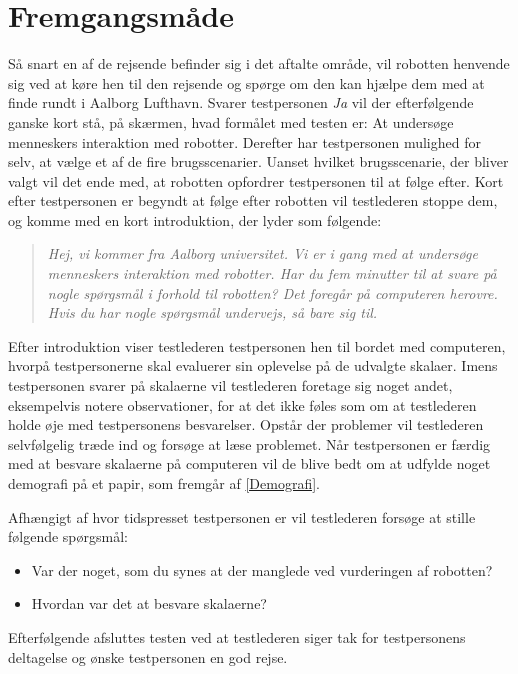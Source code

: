 \section{Fremgangsmåde}
\label{TestAfSkalaFremgangsmaade}
%
Så snart en af de rejsende befinder sig i det aftalte område, vil robotten henvende sig ved at køre hen til den rejsende og spørge om den kan hjælpe dem med at finde rundt i Aalborg Lufthavn. Svarer testpersonen \textit{Ja} vil der efterfølgende ganske kort stå, på skærmen, hvad formålet med testen er: At undersøge menneskers interaktion med robotter. Derefter har testpersonen mulighed for selv, at vælge et af de fire brugsscenarier. Uanset hvilket brugsscenarie, der bliver valgt vil det ende med, at robotten opfordrer testpersonen til at følge efter. Kort efter testpersonen er begyndt at følge efter robotten vil testlederen stoppe dem, og komme med en kort introduktion, der lyder som følgende: 
%
\begin{quotation}
\noindent
\textit{Hej, vi kommer fra Aalborg universitet. Vi er i gang med at undersøge menneskers interaktion med robotter. Har du fem minutter til at svare på nogle spørgsmål i forhold til robotten? Det foregår på computeren herovre. Hvis du har nogle spørgsmål undervejs, så bare sig til.}\blankline
\end{quotation}
\noindent
%
Efter introduktion viser testlederen testpersonen hen til bordet med computeren, hvorpå testpersonerne skal evaluerer sin oplevelse på de udvalgte skalaer. Imens testpersonen svarer på skalaerne vil testlederen foretage sig noget andet, eksempelvis notere observationer, for at det ikke føles som om at testlederen holde øje med testpersonens besvarelser. Opstår der problemer vil testlederen selvfølgelig træde ind og forsøge at læse problemet. Når testpersonen er færdig med at besvare skalaerne på computeren vil de blive bedt om at udfylde noget demografi på et papir, som fremgår af \autoref{Demografi}.  

Afhængigt af hvor tidspresset testpersonen er vil testlederen forsøge at stille følgende spørgsmål: \blankline
%
\begin{itemize}
	\item Var der noget, som du synes at der manglede ved vurderingen af robotten? 
	\item Hvordan var det at besvare skalaerne? 
\end{itemize} \blankline
%
Efterfølgende afsluttes testen ved at testlederen siger tak for testpersonens deltagelse og ønske testpersonen en god rejse.